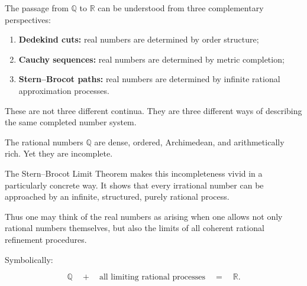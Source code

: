 \begin{remark*}
The passage from $\mathbb{Q}$ to $\mathbb{R}$ can be understood from
three complementary perspectives:

\begin{enumerate}
\item \textbf{Dedekind cuts:} real numbers are determined by order
structure;
\item \textbf{Cauchy sequences:} real numbers are determined by metric
completion;
\item \textbf{Stern--Brocot paths:} real numbers are determined by
infinite rational approximation processes.
\end{enumerate}

These are not three different continua.  They are three different ways
of describing the same completed number system.
\end{remark*}

\begin{remark*}
The rational numbers $\mathbb{Q}$ are dense, ordered, Archimedean, and
arithmetically rich.  Yet they are incomplete.

The Stern--Brocot Limit Theorem makes this incompleteness vivid in a
particularly concrete way.  It shows that every irrational number can be
approached by an infinite, structured, purely rational process.

Thus one may think of the real numbers as arising when one allows not
only rational numbers themselves, but also the limits of all coherent
rational refinement procedures.

Symbolically:

\[
\mathbb{Q}
\quad+\quad
\text{all limiting rational processes}
\quad=\quad
\mathbb{R}.
\]

\end{remark*}
